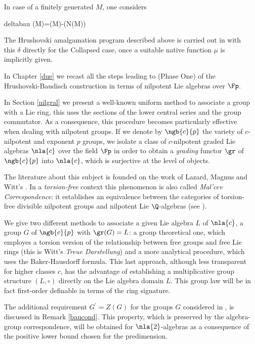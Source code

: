 In case of a finitely generated $M$, one considers
\begin{labeq}{deltabau}
\delta(M)=\dfp(M)-\dfp(N(M))
\end{labeq}
The Hrushovski amalgamation program described above is carried out in \cite{bad} with this $\delta$ directly for the Collapsed case,
once a suitable native function $\mu$ is implicitly given. 

\smallskip
In Chapter \ref{due} we recast all the steps leading to (Phase One) of the Hrushovski-Baudisch construction in terms
of nilpotent Lie algebras over $\Fp$.

\crule
In Section \ref{nilgral} we present a well-known uniform method to associate a group
with a Lie ring, this uses the sections of the lower central series and the group commutator.
As a consequence, this procedure becomes particularly effective when dealing with nilpotent groups.
If we denote by $\ngb{c}{p}$ the variety %
of $c$-nilpotent and exponent $p$ groups, we isolate a class of $c$-nilpotent graded Lie algebras $\nla{c}$ over the field $\Fp$
in order to obtain a {\em grading} functor $\gr$ of $\ngb{c}{p}$ into $\nla{c}$, which is surjective
at the level of objects.

The literature about this subject is founded on the work of Lazard, Magnus \cite{laz,mag,mag37} and
Witt's \cite{witt}. In a {\em torsion-free} context this phenomenon is
also called {\em Mal'cev Correspondence}: it establishes an equivalence between the categories of
torsion-free divisible nilpotent groups and nilpotent Lie $\Q$-algebras (see \cite[\S6]{bah}). 

We give two different methods to associate a given Lie algebra $L$ of $\nla{c}$, a group $G$ of $\ngb{c}{p}$ with $\gr(G)=L$:
a group theoretical one, which employes a torsion version of the relationship between free groups and free Lie
rings (this is Witt's {\em Treue Darstellung}) and
a more analytical procedure, which uses the Baker-Hausdorff formula.
This last approach, although less transparent for higher classes $c$, has the advantage of establishing a multiplicative group
structure $(L,\circ)$ directly on the Lie algebra domain $L$.
This group law will be in fact first-order definable in terms of the ring signature.

\smallskip
The additional requirement $G^{\prime}=Z(G)$ for the groups $G$ considered in \cite{bad},
is discussed in Remark \ref{baucond}. This property, which is preserved by the algebra-group correspondence,
will be obtained for $\nla{2}$-algebras as a consequence of the positive lower bound chosen for the predimension.

